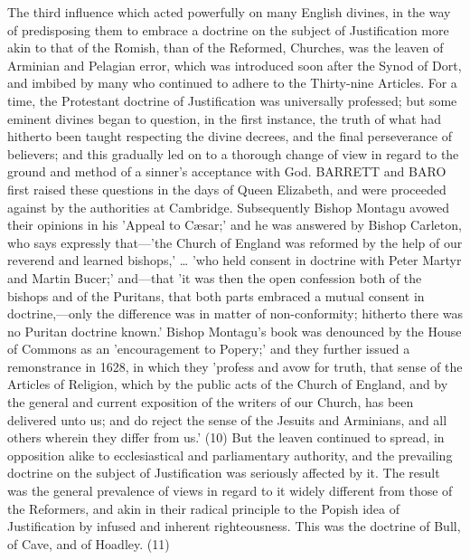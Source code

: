 \documentclass[
]{book}
\begin{document}
The third influence which acted powerfully on many English divines, in the way of predisposing them to embrace a doctrine on the subject of Justification more akin to that of the Romish, than of the Reformed, Churches, was the leaven of Arminian and Pelagian error, which was introduced soon after the Synod of Dort, and imbibed by many who continued to adhere to the Thirty-nine Articles. For a time, the Protestant doctrine of Justification was universally professed; but some eminent divines began to question, in the first instance, the truth of what had hitherto been taught respecting the divine decrees, and the final perseverance of believers; and this gradually led on to a thorough change of view in regard to the ground and method of a sinner's acceptance with God. BARRETT and BARO first raised these questions in the days of Queen Elizabeth, and were proceeded against by the authorities at Cambridge. Subsequently Bishop Montagu avowed their opinions in his 'Appeal to Cæsar;' and he was answered by Bishop Carleton, who says expressly that---'the Church of England was reformed by the help of our reverend and learned bishops,' \ldots{} 'who held consent in doctrine with Peter Martyr and Martin Bucer;' and---that 'it was then the open confession both of the bishops and of the Puritans, that both parts embraced a mutual consent in doctrine,---only the difference was in matter of non-conformity; hitherto there was no Puritan doctrine known.' Bishop Montagu's book was denounced by the House of Commons as an 'encouragement to Popery;' and they further issued a remonstrance in 1628, in which they 'profess and avow for truth, that sense of the Articles of Religion, which by the public acts of the Church of England, and by the general and current exposition of the writers of our Church, has been delivered unto us; and do reject the sense of the Jesuits and Arminians, and all others wherein they differ from us.' (10) But the leaven continued to spread, in opposition alike to ecclesiastical and parliamentary authority, and the prevailing doctrine on the subject of Justification was seriously affected by it. The result was the general prevalence of views in regard to it widely different from those of the Reformers, and akin in their radical principle to the Popish idea of Justification by infused and inherent righteousness. This was the doctrine of Bull, of Cave, and of Hoadley. (11)
\end{document}
